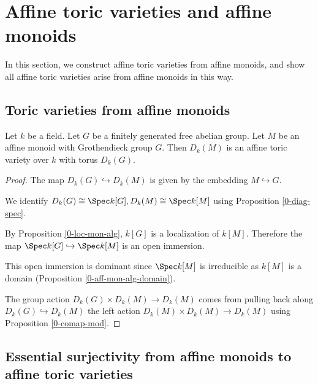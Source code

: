 \section{Affine toric varieties and affine monoids}\label{sec:aff-tor-var}


In this section, we construct affine toric varieties from affine monoids,
and show all affine toric varieties arise from affine monoids in this way.


\subsection{Toric varieties from affine monoids}


\begin{proposition}
  \label{1-1-aff-tor-var-diag-aff-mon}

  Let $k$ be a field.
  Let $G$ be a finitely generated free abelian group.
  Let $M$ be an affine monoid with Grothendieck group $G$.
  Then $D_k(M)$ is an affine toric variety over $k$ with torus $D_k(G)$.
\end{proposition}
\begin{proof}

  The map $D_k(G) \hookrightarrow D_k(M)$ is given by the embedding $M \hookrightarrow G$.

  We identify $D_k(G) \cong \Spec k[G], D_k(M) \cong \Spec k[M]$ using
  Proposition \ref{0-diag-spec}.

  By Proposition \ref{0-loc-mon-alg}, $k[G]$ is a localization of $k[M]$.
  Therefore the map $\Spec k[G] \hookrightarrow \Spec k[M]$ is an open immersion.

  This open immersion is dominant since $\Spec k[M]$ is irreducible as $k[M]$ is a domain
  (Proposition \ref{0-aff-mon-alg-domain}).

  The group action $D_k(G) \times D_k(M) \to D_k(M)$ comes
  from pulling back along $D_k(G) \hookrightarrow D_k(M)$
  the left action $D_k(M) \times D_k(M) \to D_k(M)$ using Proposition \ref{0-comap-mod}.
\end{proof}


\subsection{Essential surjectivity from affine monoids to affine toric varieties}


